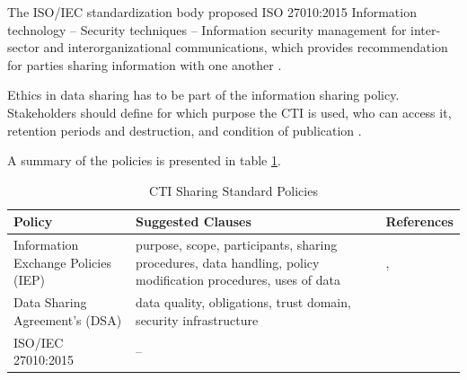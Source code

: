 The ISO/IEC standardization body proposed ISO 27010:2015 Information technology – Security techniques – Information security management
for inter-sector and interorganizational communications, which provides recommendation for parties sharing information with one another \cite{noauthor_isoiec_nodate}.

Ethics in data sharing has to be part of the information
sharing policy. Stakeholders should define for which purpose the CTI is used, who can access it, retention periods and destruction, and condition of publication \cite{wagner_cyber_2019}. 

A summary of the policies is presented in table \ref{tab:policies}.


\begin{table}[ht]
    \caption{CTI Sharing Standard Policies \cite{wagner_cyber_2019}}
    \label{tab:policies}
    \begin{tabularx}{\textwidth}{XXX}
        \hline
        Policy & Suggested Clauses & References  \\
        \hline
        \hline
        Information Exchange Policies (IEP) & purpose, scope, participants, sharing procedures, data handling, policy modification procedures, uses of data & \cite{dandurand_towards_2013}, \cite{serrano_design_2014} \\
        Data Sharing Agreement’s (DSA) & data quality, obligations, trust domain, security infrastructure & \cite{martinelli_formal_2012} \\
        ISO/IEC 27010:2015 & -- & \cite{noauthor_isoiec_nodate} \\
    \end{tabularx}
\end{table}


